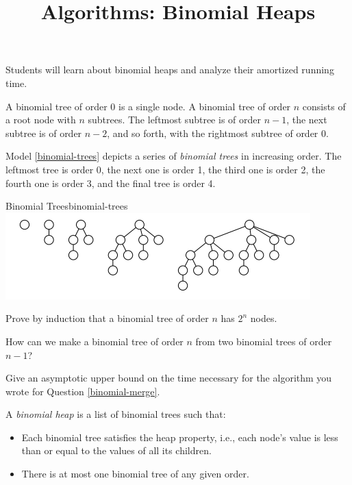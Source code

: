 \documentclass{tufte-handout}
\title{Algorithms: Binomial Heaps}
\date{}
\begin{document}
\maketitle



\begin{objective}
  Students will learn about binomial heaps and analyze their amortized running time.
\end{objective}

\begin{questions}

\item A binomial tree of order 0 is a single node. A binomial tree of order $n$ consists of a root node with $n$ subtrees. The leftmost subtree is of order $n-1$, the next subtree is of order $n-2$, and so forth, with the rightmost subtree of order 0.

Model \ref{binomial-trees} depicts a series of \emph{binomial trees} in increasing order. The leftmost tree is order 0, the next one is order 1, the third one is order 2, the fourth one is order 3, and the final tree is order 4.

\begin{model*}{Binomial Trees}{binomial-trees}
  \includegraphics[]{binomial_trees.PNG}
  \label{binomial-trees}
\end{model*}

Prove by induction that a binomial tree of order $n$ has $2^n$ nodes.

\item How can we make a binomial tree of order $n$ from two binomial trees of order $n - 1$? \label{binomial-merge}

\item Give an asymptotic upper bound on the time necessary for the algorithm you wrote for Question \ref{binomial-merge}.

\item A \emph{binomial heap} is a list of binomial trees such that:
\begin{itemize}
    \item Each binomial tree satisfies the heap property, i.e., each node's value is less than or equal to the values of all its children.
    \item There is at most one binomial tree of any given order.
\end{itemize}


\end{questions}
\end{document}
